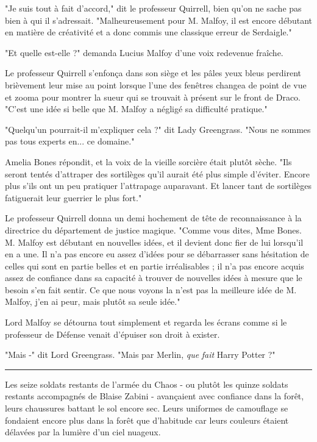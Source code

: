 "Je suis tout à fait d'accord," dit le professeur Quirrell, bien qu'on ne sache pas bien à qui il s'adressait. "Malheureusement pour M. Malfoy, il est encore débutant en matière de créativité et a donc commis une classique erreur de Serdaigle."

"Et quelle est-elle ?" demanda Lucius Malfoy d'une voix redevenue fraîche.

Le professeur Quirrell s'enfonça dans son siège et les pâles yeux bleus perdirent brièvement leur mise au point lorsque l'une des fenêtres changea de point de vue et zooma pour montrer la sueur qui se trouvait à présent sur le front de Draco. "C'est une idée si belle que M. Malfoy a négligé sa difficulté pratique."

"Quelqu'un pourrait-il m'expliquer cela ?" dit Lady Greengrass. "Nous ne sommes pas tous experts en... ce domaine."

Amelia Bones répondit, et la voix de la vieille sorcière était plutôt sèche. "Ils seront tentés d'attraper des sortilèges qu'il aurait été plus simple d'éviter. Encore plus s'ils ont un peu pratiquer l'attrapage auparavant. Et lancer tant de sortilèges fatiguerait leur guerrier le plus fort."

Le professeur Quirrell donna un demi hochement de tête de reconnaissance à la directrice du département de justice magique. "Comme vous dites, Mme Bones. M. Malfoy est débutant en nouvelles idées, et il devient donc fier de lui lorsqu'il en a une. Il n'a pas encore eu assez d'idées pour se débarrasser sans hésitation de celles qui sont en partie belles et en partie irréalisables ; il n'a pas encore acquis assez de confiance dans sa capacité à trouver de nouvelles idées à mesure que le besoin s'en fait sentir. Ce que nous voyons la n'est pas la meilleure idée de M. Malfoy, j'en ai peur, mais plutôt sa seule idée."

Lord Malfoy se détourna tout simplement et regarda les écrans comme si le professeur de Défense venait d'épuiser son droit à exister.

"Mais -" dit Lord Greengrass. "Mais par Merlin, \emph{que}  \emph{fait}  Harry Potter ?"
\par\noindent\rule{\textwidth}{0.4pt}
Les seize soldats restants de l'armée du Chaos - ou plutôt les quinze soldats restants accompagnés de Blaise Zabini - avançaient avec confiance dans la forêt, leurs chaussures battant le sol encore sec. Leurs uniformes de camouflage se fondaient encore plus dans la forêt que d'habitude car leurs couleurs étaient délavées par la lumière d'un ciel nuageux.

